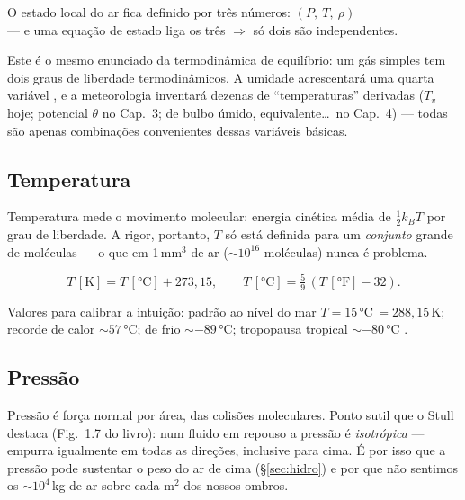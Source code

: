 \documentclass[11pt]{article}
\begin{document}
\begin{noquadro}
O estado local do ar fica definido por três números: $(P,\ T,\ \rho)$\\
--- e uma equação de estado liga os três $\Rightarrow$ só dois são
independentes.
\end{noquadro}

Este é o mesmo enunciado da termodinâmica de equilíbrio: um gás simples tem
dois graus de liberdade termodinâmicos. A umidade acrescentará uma quarta
variável , e a meteorologia inventará dezenas de
``temperaturas'' derivadas ($T_v$ hoje; potencial $\theta$ no Cap.~3; de
bulbo úmido, equivalente\ldots\ no Cap.~4) — todas são apenas combinações
convenientes dessas variáveis básicas.

\subsection{Temperatura}

Temperatura mede o movimento molecular: energia cinética média de
$\tfrac12 k_B T$ por grau de liberdade. A rigor, portanto, $T$ só está
definida para um \emph{conjunto} grande de moléculas — o que em 1\,mm$^3$ de
ar ($\sim 10^{16}$ moléculas) nunca é problema.

\begin{formalivro}[conversões]
\[ T\,[\mathrm{K}] = T\,[°\mathrm{C}] + 273{,}15, \qquad
   T\,[°\mathrm{C}] = \tfrac{5}{9}\,(T\,[°\mathrm{F}] - 32). \]
\end{formalivro}


Valores para calibrar a intuição: padrão ao nível do mar
$T=15\,°$C$\,=288{,}15$\,K; recorde de calor $\sim 57\,°$C; de frio
$\sim -89\,°$C; tropopausa tropical $\sim -80\,°$C
.

\subsection{Pressão}

Pressão é força normal por área, das colisões moleculares. Ponto sutil que o
Stull destaca (Fig.~1.7 do livro): num fluido em repouso a pressão é
\emph{isotrópica} — empurra igualmente em todas as direções, inclusive para
cima. É por isso que a pressão pode sustentar o peso do ar de cima
(\S\ref{sec:hidro}) e por que não sentimos os $\sim 10^4$\,kg de ar sobre
cada m$^2$ dos nossos ombros.
\end{document}

